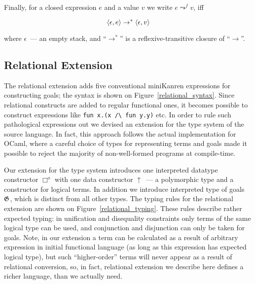 Finally, for a closed expression $e$ and a value $v$ we write $e \leadsto^f v$, iff 

$$\left<{\epsilon,e}\right>\to^*\left<{\epsilon,v}\right>$$

\noindent where $\epsilon$~--- an empty stack, and ``$\to^*$'' is a reflexive-transitive closure of ``$\to$''.

\subsection{Relational Extension}
\label{relational_extension}

The relational extension adds five conventional miniKanren expressions for constructing goals; the syntax is shown on Figure~\ref{relational_syntax}.
Since relational constructs are added to regular functional ones, it becomes possible to construct expressions like \lstinline|fun x.(x /\ fun y.y)| etc.
In order to rule such pathological expressions out we devised an extension for the type system of the source language. In fact, this approach follows the
actual implementation for OCaml, where a careful choice of types for representing terms and goals made it possible to reject the majority of non-well-formed
programs at compile-time.



Our extension for the type system introduces one interpreted datatype constructor $\Box^o$ with one data constructor $\uparrow$~--- a polymorphic type and
a constructor for logical terms. In addition we introduce interpreted type of goals $\mathfrak G$, which is distinct from all other types. The typing rules for the relational 
extension are shown on Figure~\ref{relational_typing}. These rules describe rather expected typing: in unification and disequality constraints only
terms of the same logical type can be used, and conjunction and disjunction can only be taken for goals. Note, in our extension a term can be calculated as
a result of arbitrary expression in initial functional language (as long as this expression has expected logical type), but such ``higher-order'' terms will
never appear as a result of relational conversion, so, in fact, relational extension we describe here defines a richer language, than we actually need.

